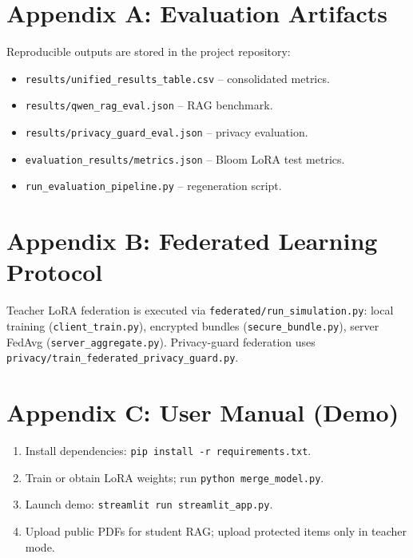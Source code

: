 \chapter{Appendix A: Evaluation Artifacts}
\label{appendix:eval}
Reproducible outputs are stored in the project repository:
\begin{itemize}
    \item \texttt{results/unified\_results\_table.csv} -- consolidated metrics.
    \item \texttt{results/qwen\_rag\_eval.json} -- RAG benchmark.
    \item \texttt{results/privacy\_guard\_eval.json} -- privacy evaluation.
    \item \texttt{evaluation\_results/metrics.json} -- Bloom LoRA test metrics.
    \item \texttt{run\_evaluation\_pipeline.py} -- regeneration script.
\end{itemize}

\chapter{Appendix B: Federated Learning Protocol}
\label{appendix:fl}
Teacher LoRA federation is executed via \texttt{federated/run\_simulation.py}: local training (\texttt{client\_train.py}), encrypted bundles (\texttt{secure\_bundle.py}), server FedAvg (\texttt{server\_aggregate.py}). Privacy-guard federation uses \texttt{privacy/train\_federated\_privacy\_guard.py}.

\chapter{Appendix C: User Manual (Demo)}
\label{appendix:demo}
\begin{enumerate}
    \item Install dependencies: \texttt{pip install -r requirements.txt}.
    \item Train or obtain LoRA weights; run \texttt{python merge\_model.py}.
    \item Launch demo: \texttt{streamlit run streamlit\_app.py}.
    \item Upload public PDFs for student RAG; upload protected items only in teacher mode.
\end{enumerate}
